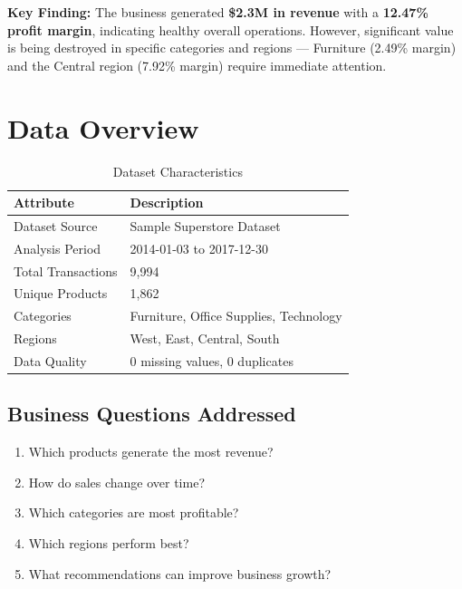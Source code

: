 \documentclass[11pt,a4paper]{article}
\begin{document}
\begin{tcolorbox}[
    colback=warningred!5,
    colframe=warningred!30,
    arc=8pt,
    left=12pt,
    right=12pt
]
\textbf{Key Finding:} The business generated \textbf{\$2.3M in revenue} with a \textbf{12.47\% profit margin}, indicating healthy overall operations. However, significant value is being destroyed in specific categories and regions — Furniture (2.49\% margin) and the Central region (7.92\% margin) require immediate attention.
\end{tcolorbox}

\section{Data Overview}

\begin{table}[H]
\centering
\begin{tabular}{@{}p{4cm} p{6cm}@{}}
\toprule
\rowcolor{primary!10}
\textbf{Attribute} & \textbf{Description} \\
\midrule
Dataset Source & Sample Superstore Dataset \\
Analysis Period & 2014-01-03 to 2017-12-30 \\
Total Transactions & 9,994 \\
Unique Products & 1,862 \\
Categories & Furniture, Office Supplies, Technology \\
Regions & West, East, Central, South \\
Data Quality & 0 missing values, 0 duplicates \\
\bottomrule
\end{tabular}
\caption{Dataset Characteristics}
\end{table}

\subsection{Business Questions Addressed}
\begin{enumerate}[label=\color{accent}\textbf{Q\arabic*:}, leftmargin=*]
    \item Which products generate the most revenue?
    \item How do sales change over time?
    \item Which categories are most profitable?
    \item Which regions perform best?
    \item What recommendations can improve business growth?
\end{enumerate}
\end{document}
